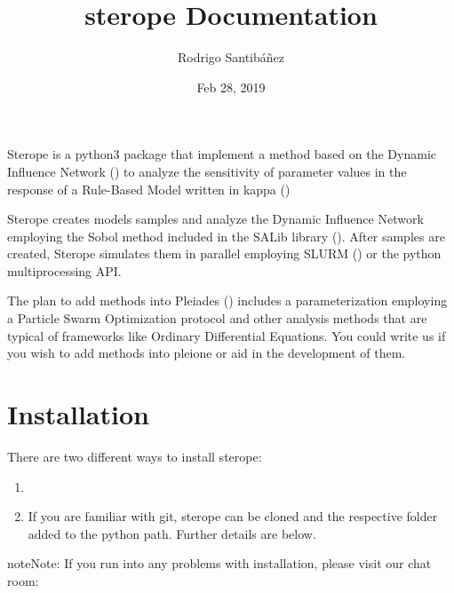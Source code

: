 \documentclass[letterpaper,10pt,english]{sphinxmanual}
\title{sterope Documentation}
\date{Feb 28, 2019}
\author{Rodrigo Santibáñez}
\begin{document}
\pagestyle{empty}
\sphinxmaketitle
\pagestyle{plain}
\sphinxtableofcontents
\pagestyle{normal}
\label{\detokenize{index::doc}}


Sterope is a python3 package that implement a method based on the Dynamic
Influence Network () to analyze the
sensitivity of parameter values in the response of a Rule-Based Model written in
kappa ()

Sterope creates models samples and analyze the Dynamic Influence Network employing
the Sobol method included in the SALib library (). After samples are
created, Sterope simulates them in parallel employing SLURM () or the
python multiprocessing API.

The plan to add methods into Pleiades ()
includes a parameterization employing a Particle Swarm Optimization protocol and
other analysis methods that are typical of frameworks like Ordinary Differential
Equations. You could write us if you wish to add methods into pleione or aid in
the development of them.


\chapter{Installation}
\label{\detokenize{Installation:installation}}\label{\detokenize{Installation::doc}}
There are two different ways to install sterope:
\begin{enumerate}
\def\theenumi{\arabic{enumi}}
\def\labelenumi{\theenumi .}
\makeatletter\def\p@enumii{\p@enumi \theenumi .}\makeatother
\item {} 


\item {} 
 If you are familiar with git, sterope can
be cloned and the respective folder added to the python path. Further details
are below.

\end{enumerate}

\begin{sphinxadmonition}{note}{Note:}
If you run into any problems with installation, please visit our chat room:
\end{sphinxadmonition}
\end{document}
